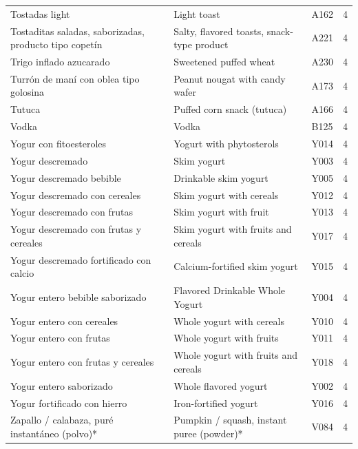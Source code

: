 {\begin{longtable}{p{4.3cm}p{5.5cm}p{1.5cm}p{0.7cm}}
Tostadas light & Light toast & A162 & 4\\
Tostaditas saladas, saborizadas, producto tipo copetín & Salty, flavored toasts, snack-type product & A221 & 4\\
Trigo inflado azucarado & Sweetened puffed wheat & A230 & 4\\
Turrón de maní con oblea tipo golosina & Peanut nougat with candy wafer & A173 & 4\\
Tutuca & Puffed corn snack (tutuca) & A166 & 4\\
Vodka & Vodka & B125 & 4\\
Yogur con fitoesteroles & Yogurt with phytosterols & Y014 & 4\\
Yogur descremado & Skim yogurt & Y003 & 4\\
Yogur descremado bebible & Drinkable skim yogurt & Y005 & 4\\
Yogur descremado con cereales & Skim yogurt with cereals & Y012 & 4\\
Yogur descremado con frutas & Skim yogurt with fruit & Y013 & 4\\
Yogur descremado con frutas y cereales & Skim yogurt with fruits and cereals & Y017 & 4\\
Yogur descremado fortificado con calcio & Calcium-fortified skim yogurt & Y015 & 4\\
Yogur entero bebible saborizado & Flavored Drinkable Whole Yogurt & Y004 & 4\\
Yogur entero con cereales & Whole yogurt with cereals & Y010 & 4\\
Yogur entero con frutas & Whole yogurt with fruits & Y011 & 4\\
Yogur entero con frutas y cereales & Whole yogurt with fruits and cereals & Y018 & 4\\
Yogur entero saborizado & Whole flavored yogurt & Y002 & 4\\
Yogur fortificado con hierro & Iron-fortified yogurt & Y016 & 4\\
Zapallo / calabaza, puré instantáneo (polvo)* & Pumpkin / squash, instant puree (powder)* & V084 & 4\\
\end{longtable}
}
